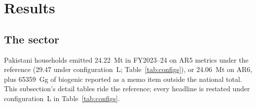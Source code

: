 \section{Results}
\label{sec:results}

\subsection{The sector}

Pakistani households emitted \SI{24.22}{\mega\tonne} \COe{} in FY2023--24 on AR5 metrics
under the reference (\SI{29.47}{} under configuration~L; Table~\ref{tab:configs}), or
\SI{24.06}{\mega\tonne} on AR6, plus \SI{65359}{\giga\gram} of biogenic \COtwo{} reported
as a memo item outside the national total. This subsection's detail tables ride the
reference; every headline is restated under configuration~L in
Table~\ref{tab:configs}.

